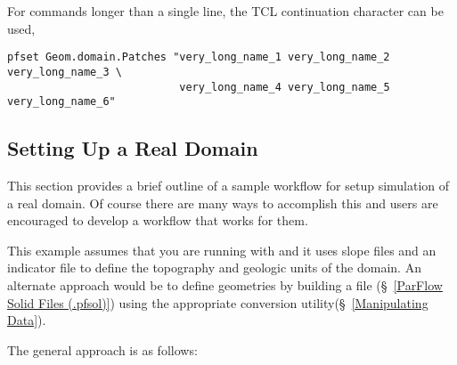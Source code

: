 For commands longer than a single line, the TCL continuation character can be
used, 
\begin{display}\begin{verbatim}
pfset Geom.domain.Patches "very_long_name_1 very_long_name_2 very_long_name_3 \
                           very_long_name_4 very_long_name_5 very_long_name_6"
\end{verbatim}\end{display}

\subsection{Setting Up a Real Domain}
\label{Defining a Real domain}

This section provides a brief outline of a sample workflow for setup \parflow{}  
simulation of a real domain. Of course there are many ways to accomplish this and users
are encouraged to develop a workflow that works for them. 

This example assumes that you are running with \parflow{}  and it uses 
slope files and an indicator file to define the topography and geologic units of the domain. 
An alternate approach would be to define geometries by building a \file{.pfsol} file 
(\S~\ref{ParFlow Solid Files (.pfsol)}) using the appropriate \pftools{} conversion 
utility(\S~\ref{Manipulating Data}).

The general approach is as follows:

